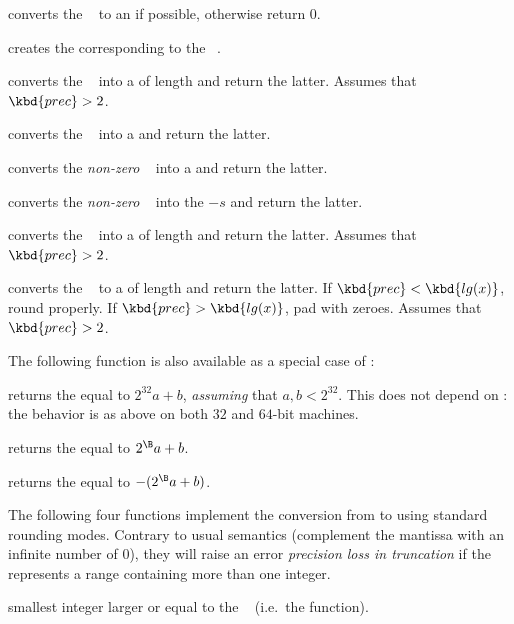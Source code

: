  converts the ~ to an
 if possible, otherwise return $0$.

 creates the  corresponding to the
~.

 converts the ~ into a
 of length  and return the latter. Assumes that
$\kbd{prec} > 2$.

 converts the ~ into a 
and return the latter.

 converts the \emph{non-zero} ~
into a  and return the latter.

 converts the \emph{non-zero} ~
into the  $-s$ and return the latter.

 converts the ~ into a
 of length  and return the latter. Assumes that
$\kbd{prec} > 2$.

 converts the ~ to a
 of length  and return the latter. If
$\kbd{prec} < \kbd{lg(x)}$, round properly. If $\kbd{prec} > \kbd{lg(x)}$,
pad with zeroes. Assumes that $\kbd{prec} > 2$.

\noindent The following function is also available as a special case of
:

 returns the  equal to $2^{32} a +
b$, \emph{assuming} that $a,b < 2^{32}$. This does not depend on
: the behavior is as above on both $32$ and $64$-bit
machines.

 returns the  equal to
$2^{\B} a + b$.

 returns the  equal to
$-(2^{\B} a + b)$.

The following four functions implement the conversion from  to
 using standard rounding modes. Contrary to usual semantics
(complement the mantissa with an infinite number of 0), they will raise an
error \emph{precision loss in truncation} if the  represents a
range containing more than one integer.

 smallest integer larger or equal
to the ~ (i.e.~the  function).

